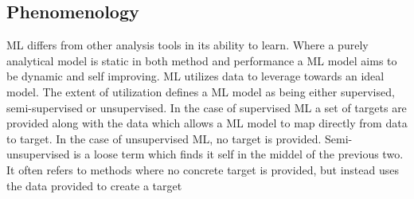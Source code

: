 \subsection{Phenomenology}
\ac{ML} differs from other analysis tools in its ability to
learn. Where a purely analytical model is static in both method 
and performance a \ac{ML} model aims to be dynamic and self 
improving. \ac{ML} utilizes data to leverage towards an ideal
model. The extent of utilization defines a \ac{ML} model as being
either supervised, semi-supervised or unsupervised. In the case 
of supervised \ac{ML} a set of targets are provided along with the
data which allows a \ac{ML} model to map directly from data to target.
In the case of unsupervised \ac{ML}, no target is provided. Semi-unsupervised
is a loose term which finds it self in the middel of the previous two. 
It often refers to methods where no concrete target is provided, 
but instead uses the data provided to create a target 